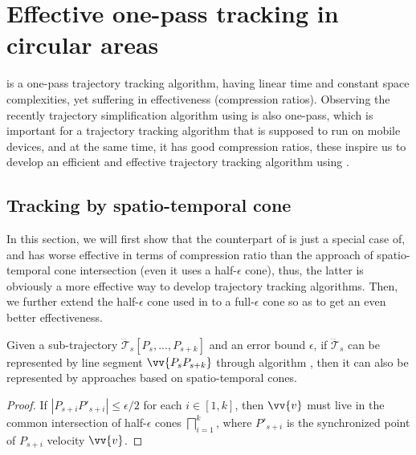 \section{Effective one-pass tracking in circular areas}
\label{sec:circular}

\ldrh is a one-pass trajectory tracking algorithm, having linear time and constant space complexities, yet suffering in effectiveness (compression ratios).
Observing the recently trajectory simplification algorithm \cised using \sed is also one-pass, which is important for a trajectory tracking algorithm that is supposed to run on mobile devices, and at the same time, it has good compression ratios, these inspire us to develop an efficient and effective trajectory tracking algorithm using \sed.

\subsection{Tracking by spatio-temporal cone}

In this section, we will first show that the counterpart of \ldrh is just a special case of, and has worse effective in terms of compression ratio than the approach of spatio-temporal cone intersection (even it uses a half-$\epsilon$ cone), thus, the latter is obviously a more effective way to develop trajectory tracking algorithms. Then, we further extend the half-$\epsilon$ cone used in \cised to a full-$\epsilon$ cone so as to get an even better effectiveness.



\begin{proposition}
\label{theo-ldrh-cised}
Given a sub-trajectory $\dddot{\mathcal{T}}_s[P_s,...,P_{s+k}]$ and an error bound $\epsilon$, if $\dddot{\mathcal{T}}_s$ can be represented by line segment $\vv{P_sP_{s+k}}$ through algorithm \ldrh, then it can also be represented by approaches based on spatio-temporal cones.
\end{proposition}

\begin{proof}

If $|P_{s+i}P'_{s+i}|\le \epsilon/2$ for each $i \in [1,k]$, then $\vv{v}$ must live in the common intersection of half-$\epsilon$ cones $\bigsqcap_{i=1}^{k}$, where $P'_{s+i}$ is the synchronized point of $P_{s+i}$ \wrt velocity $\vv{v}$.
\end{proof}

